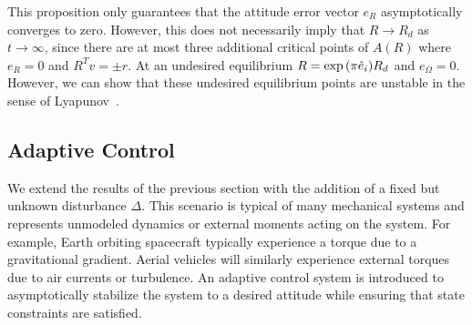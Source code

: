 \documentclass[fleqn]{IJCAS}  %
\begin{document}
\begin{multicols}{2}
This proposition only guarantees that the attitude error vector \( e_R \) asymptotically converges to zero.
However, this does not necessarily imply that \( R \to R_d \) as \( t \to \infty \), since there are at most three additional critical points of \( A(R) \) where \( e_R = 0 \) and \( R^T v = \pm r\).
At an undesired equilibrium \( R = \exp{ \ensuremath{\left( \pi \hat{e}_i \right)}} R_d \) and \( e_\Omega =0 \).
However, we can show that these undesired equilibrium points are unstable in the sense of Lyapunov~\cite{LeeITCST13}.

\subsection{Adaptive Control}
We extend the results of the previous section with the addition of a fixed but unknown disturbance \( \Delta \).
This scenario is typical of many mechanical systems and represents unmodeled dynamics or external moments acting on the system.
For example, Earth orbiting spacecraft typically experience a torque due to a gravitational gradient.
Aerial vehicles will similarly experience external torques due to air currents or turbulence.
An adaptive control system is introduced to asymptotically stabilize the system to a desired attitude while ensuring that state constraints are satisfied. %


\end{multicols}
\end{document}
